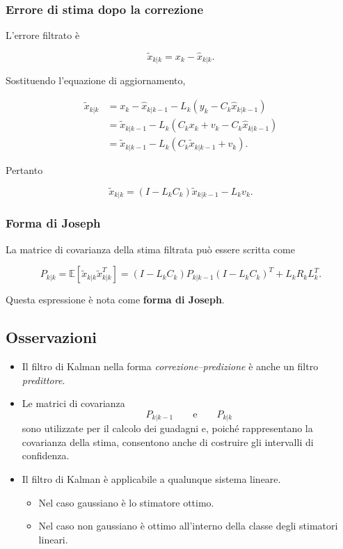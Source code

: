 \documentclass[11pt,a4paper]{article}
\begin{document}
\subsubsection*{Errore di stima dopo la correzione}

L'errore filtrato è

\[
\tilde{x}_{k|k}
=
x_k-\hat{x}_{k|k}.
\]

Sostituendo l'equazione di aggiornamento,

\[
\begin{aligned}
\tilde{x}_{k|k}
&=
x_k
-
\hat{x}_{k|k-1}
-
L_k
\left(
y_k-C_k\hat{x}_{k|k-1}
\right)
\\
&=
\tilde{x}_{k|k-1}
-
L_k
\left(
C_kx_k+v_k-C_k\hat{x}_{k|k-1}
\right)
\\
&=
\tilde{x}_{k|k-1}
-
L_k
\left(
C_k\tilde{x}_{k|k-1}+v_k
\right).
\end{aligned}
\]

Pertanto

\[
\boxed{
\tilde{x}_{k|k}
=
(I-L_kC_k)\tilde{x}_{k|k-1}
-
L_kv_k.
}
\]

\subsubsection*{Forma di Joseph}

La matrice di covarianza della stima filtrata può essere scritta come

\[
\boxed{
P_{k|k}
=
\mathbb{E}
\!\left[
\tilde{x}_{k|k}\tilde{x}_{k|k}^{T}
\right]
=
(I-L_kC_k)
P_{k|k-1}
(I-L_kC_k)^T
+
L_kR_kL_k^T.
}
\]

Questa espressione è nota come \textbf{forma di Joseph}.

\subsection*{Osservazioni}

\begin{itemize}
    \item Il filtro di Kalman nella forma \emph{correzione--predizione} è anche un filtro \emph{predittore}.
    
    \item Le matrici di covarianza
    \[
    P_{k|k-1}
    \qquad\text{e}\qquad
    P_{k|k}
    \]
    sono utilizzate per il calcolo dei guadagni e, poiché rappresentano la covarianza della stima, consentono anche di costruire gli intervalli di confidenza.
    
    \item Il filtro di Kalman è applicabile a qualunque sistema lineare.
    \begin{itemize}
        \item Nel caso gaussiano è lo stimatore ottimo.
        \item Nel caso non gaussiano è ottimo all'interno della classe degli stimatori lineari.
    \end{itemize}
\end{itemize}
\end{document}
